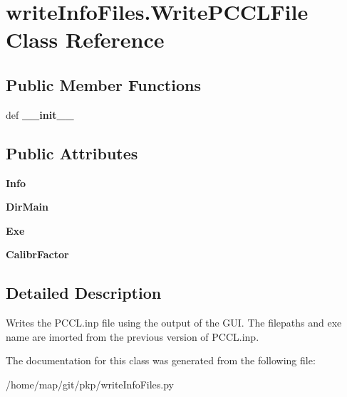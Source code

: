 \hypertarget{classwriteInfoFiles_1_1WritePCCLFile}{\section{write\-Info\-Files.\-Write\-P\-C\-C\-L\-File \-Class \-Reference}
\label{classwriteInfoFiles_1_1WritePCCLFile}
}
\subsection*{\-Public \-Member \-Functions}
\begin{DoxyCompactItemize}
\item 
\hypertarget{classwriteInfoFiles_1_1WritePCCLFile_a00765660569b4ad8dddcd150f63f8f61}{def {\bfseries \-\_\-\-\_\-init\-\_\-\-\_\-}}\label{classwriteInfoFiles_1_1WritePCCLFile_a00765660569b4ad8dddcd150f63f8f61}

\end{DoxyCompactItemize}
\subsection*{\-Public \-Attributes}
\begin{DoxyCompactItemize}
\item 
\hypertarget{classwriteInfoFiles_1_1WritePCCLFile_a656e4b82826056b92ea86aee2bd19956}{{\bfseries \-Info}}\label{classwriteInfoFiles_1_1WritePCCLFile_a656e4b82826056b92ea86aee2bd19956}

\item 
\hypertarget{classwriteInfoFiles_1_1WritePCCLFile_a6c0208b5eee47545b9681fb1fe78e4fb}{{\bfseries \-Dir\-Main}}\label{classwriteInfoFiles_1_1WritePCCLFile_a6c0208b5eee47545b9681fb1fe78e4fb}

\item 
\hypertarget{classwriteInfoFiles_1_1WritePCCLFile_adf462d8d9c5d1d4e4390ddb9ad7f9e44}{{\bfseries \-Exe}}\label{classwriteInfoFiles_1_1WritePCCLFile_adf462d8d9c5d1d4e4390ddb9ad7f9e44}

\item 
\hypertarget{classwriteInfoFiles_1_1WritePCCLFile_a8a7acd0913bef5e4834b0c998c2b4a41}{{\bfseries \-Calibr\-Factor}}\label{classwriteInfoFiles_1_1WritePCCLFile_a8a7acd0913bef5e4834b0c998c2b4a41}

\end{DoxyCompactItemize}


\subsection{\-Detailed \-Description}
\begin{DoxyVerb}Writes the PCCL.inp file using the output of the GUI. The filepaths and exe name are imorted from the previous version of PCCL.inp.\end{DoxyVerb}
 

\-The documentation for this class was generated from the following file\-:\begin{DoxyCompactItemize}
\item 
/home/map/git/pkp/write\-Info\-Files.\-py\end{DoxyCompactItemize}
